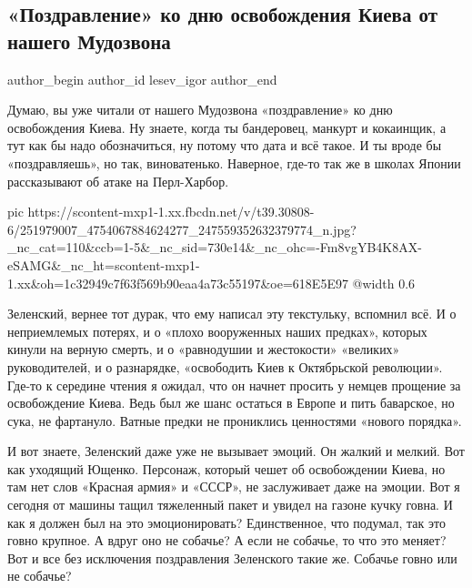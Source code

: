  
 
 
 
 
 
\subsection{«Поздравление» ко дню освобождения Киева от нашего Мудозвона}
\label{sec:06_11_2021.fb.lesev_igor.1.pozdravlenie_mudozvon_kiev}
 
\ifcmt
 author_begin
   author_id lesev_igor
 author_end
\fi

Думаю, вы уже читали от нашего Мудозвона «поздравление» ко дню освобождения
Киева. Ну знаете, когда ты бандеровец, манкурт и кокаинщик, а тут как бы надо
обозначиться, ну потому что дата и всё такое. И ты вроде бы «поздравляешь», но
так, виноватенько. Наверное, где-то так же в школах Японии рассказывают об
атаке на Перл-Харбор.

\ifcmt
  pic https://scontent-mxp1-1.xx.fbcdn.net/v/t39.30808-6/251979007_4754067884624277_247559352632379774_n.jpg?_nc_cat=110&ccb=1-5&_nc_sid=730e14&_nc_ohc=-Fm8vgYB4K8AX-eSAMG&_nc_ht=scontent-mxp1-1.xx&oh=1c32949c7f63f569b90eaa4a73c55197&oe=618E5E97
  @width 0.6
\fi

Зеленский, вернее тот дурак, что ему написал эту текстульку, вспомнил всё. И о
неприемлемых потерях, и о «плохо вооруженных наших предках», которых кинули на
верную смерть, и о «равнодушии и жестокости» «великих» руководителей, и о
разнарядке, «освободить Киев к Октябрьской революции». Где-то к середине чтения
я ожидал, что он начнет просить у немцев прощение за освобождение Киева. Ведь
был же шанс остаться в Европе и пить баварское, но сука, не фартануло. Ватные
предки не прониклись ценностями «нового порядка».

И вот знаете, Зеленский даже уже не вызывает эмоций. Он жалкий и мелкий. Вот
как уходящий Ющенко. Персонаж, который чешет об освобождении Киева, но там нет
слов «Красная армия» и «СССР», не заслуживает даже на эмоции. Вот я сегодня от
машины тащил тяжеленный пакет и увидел на газоне кучку говна. И как я должен
был на это эмоционировать? Единственное, что подумал, так это говно крупное. А
вдруг оно не собачье? А если не собачье, то что это меняет? Вот и все без
исключения поздравления Зеленского такие же. Собачье говно или не собачье?


